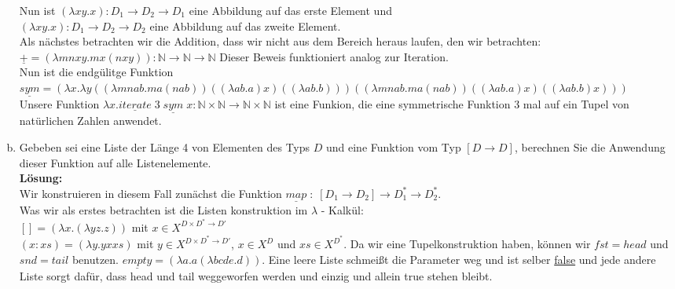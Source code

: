 \documentclass[11pt,a4paper,ngerman]{article}
\begin{document}
\begin{enumerate}[(a)]
      Nun ist $(\lambda xy.x) : D_1 \rightarrow D_2 \rightarrow D_1$ eine Abbildung auf das erste Element
      und \\$(\lambda xy.x) : D_1 \rightarrow D_2 \rightarrow D_2$ eine Abbildung auf das zweite Element.\\

      Als nächstes betrachten wir die Addition, dass wir nicht aus dem Bereich heraus laufen, den
      wir betrachten:
      $\underline{+} = (\lambda mnxy. m x (n x y)) : \mathbb{N} \rightarrow \mathbb{N} \rightarrow \mathbb{N}$
      Dieser Beweis funktioniert analog zur Iteration.\\

      Nun ist die endgülitge Funktion\\
      $\underline{sym} = (\lambda x. \lambda y ((\lambda mnab. m a (n a b)) ((\lambda ab.a)x) 
         ((\lambda ab.b))) ((\lambda mnab. m a (n a b)) ((\lambda ab.a)x) ((\lambda ab.b)x)))$\\

      Unsere Funktion $\lambda x.\underline{iterate} \; 3 \;  \underline{sym} \; x : \mathbb{N} \times \mathbb{N} 
      \rightarrow \mathbb{N} \times \mathbb{N}$ ist eine Funkion, die eine symmetrische Funktion
      3 mal auf ein Tupel von natürlichen Zahlen anwendet.
         

	\item Gebeben sei eine Liste der Länge 4 von Elementen des Typs $D$ und eine Funktion
      vom Typ $[D \rightarrow D]$, berechnen Sie die Anwendung dieser Funktion auf alle
      Listenelemente.\\
   \textbf{Lösung:}\\
      Wir konstruieren in diesem Fall zunächst die Funktion 
      $\underline{map} \; : \; [D_1 \rightarrow D_2] \rightarrow D_1^* \rightarrow D_2^*$.\\
      Was wir als erstes betrachten ist die Listen konstruktion im $\lambda$ - Kalkül:\\
      $[] = (\lambda x. (\lambda yz.z))$ mit $x\in X^{D \times D^* \rightarrow D'}$\\
      $(x:xs) = (\lambda y. y x xs)$ mit $y \in X^{D \times D^* \rightarrow D'}$, $x \in X^{D}$ 
      und $xs \in X^{D^*}$.
      Da wir eine Tupelkonstruktion haben, können wir $fst=head$ und $snd=tail$ benutzen.
      $\underline{empty} = (\lambda a.a (\lambda bcde.d))$. Eine leere Liste schmeißt die
      Parameter weg und ist selber \underline{false} und jede andere Liste sorgt dafür, dass
      head und tail weggeworfen werden und einzig und allein true stehen bleibt.\\


\end{enumerate}
\end{document}
